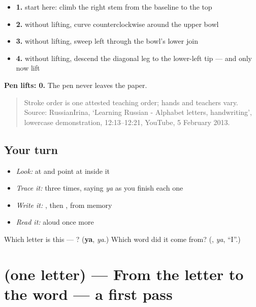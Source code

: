 \begin{itemize}
\raggedright
  \item \textbf{1.} start here: climb the right stem from the baseline to the top
  \item \textbf{2.} without lifting, curve counterclockwise around the upper bowl
  \item \textbf{3.} without lifting, sweep left through the bowl's lower join
  \item \textbf{4.} without lifting, descend the diagonal leg to the lower-left tip — and only now lift
\end{itemize}

\textbf{Pen lifts: 0.} The pen never leaves the paper.

\begin{quote}
Stroke order is one attested teaching order; hands and teachers vary. Source: RussianIrina, ‘Learning Russian - Alphabet letters, handwriting’, lowercase  demonstration, 12:13–12:21, YouTube, 5 February 2013.
\end{quote}

\subsection*{Your turn}
\begin{itemize}
\raggedright
  \item \emph{Look:} at \textbf{} and point at  inside it
  \item \emph{Trace it:}  three times, saying \emph{ya} as you finish each one
  \item \emph{Write it:} , then , from memory
  \item \emph{Read it:} \textbf{} aloud once more
\end{itemize}

\begin{tcolorbox}[breakable,colback=teal!4,colframe=teal!35!black,title={Before you move on}]
Which letter is this — ? (\textbf{ya}, \emph{ya}.) Which word did it come from? (\textbf{}, \emph{ya}, \textquotedblleft{}I\textquotedblright{}.)
\end{tcolorbox}
\section[(one letter)]{(one letter) — From the letter to the word — a first pass}

\label{lesson:RU-R28-letters-first-pass}



